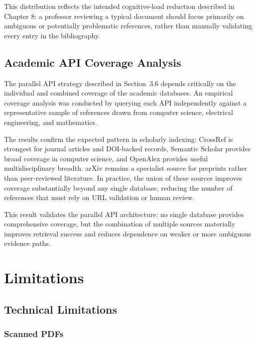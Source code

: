 \documentclass[12pt,a4paper,oneside]{report}
\begin{document}
This distribution reflects the intended cognitive-load reduction described in Chapter 8: a professor reviewing a typical document should focus primarily on ambiguous or potentially problematic references, rather than manually validating every entry in the bibliography.

\section{Academic API Coverage Analysis}

The parallel API strategy described in Section~3.6 depends critically on the individual and combined coverage of the academic databases. An empirical coverage analysis was conducted by querying each API independently against a representative sample of references drawn from computer science, electrical engineering, and mathematics.

The results confirm the expected pattern in scholarly indexing: CrossRef is strongest for journal articles and DOI-backed records, Semantic Scholar provides broad coverage in computer science, and OpenAlex provides useful multidisciplinary breadth. arXiv remains a specialist source for preprints rather than peer-reviewed literature. In practice, the union of these sources improves coverage substantially beyond any single database, reducing the number of references that must rely on URL validation or human review.

This result validates the parallel API architecture: no single database provides comprehensive coverage, but the combination of multiple sources materially improves retrieval success and reduces dependence on weaker or more ambiguous evidence paths.



\chapter{Limitations}

\section{Technical Limitations}

\subsection{Scanned PDFs}
\end{document}
